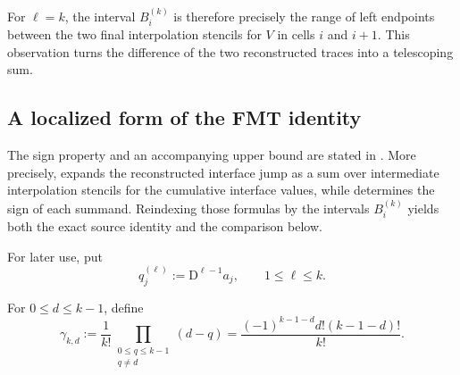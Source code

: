 \documentclass[11pt]{amsart}
\theoremstyle{plain}
\theoremstyle{definition}
\theoremstyle{remark}
\numberwithin{equation}{section}
\theoremstyle{plain}
\begin{document}
For $\ell=k$, the interval $B_i^{(k)}$ is therefore precisely the range of
left endpoints between the two final interpolation stencils for $V$ in
cells $i$ and $i+1$.  This observation turns the difference of the two
reconstructed traces into a telescoping sum.

\subsection{A localized form of the FMT identity}
\label{sec:localized-fmt}

The sign property and an accompanying upper bound are stated in
\cite[Theorem~1.1]{FMT}.  More precisely, \cite[Lemma~2.1]{FMT} expands the
reconstructed interface jump as a sum over intermediate interpolation
stencils for the cumulative interface values, while \cite[Lemma~2.2]{FMT} determines the
sign of each summand.  Reindexing those formulas by the
intervals $B_i^{(k)}$ yields both the exact source identity and the comparison
below.

For later use, put
\begin{equation}\label{eq:q-level-differences}
	q_j^{(\ell)}:=\mathrm D^{\ell-1}a_j,
	\qquad 1\le\ell\le k.
\end{equation}

For $0\le d\le k-1$, define
\begin{equation}\label{eq:localized-fmt-coefficient}
	\gamma_{k,d}
	:=\frac1{k!}
	\prod_{\substack{0\le q\le k-1\\q\ne d}}(d-q)
	=\frac{(-1)^{k-1-d}d!(k-1-d)!}{k!}.
\end{equation}
\end{document}
